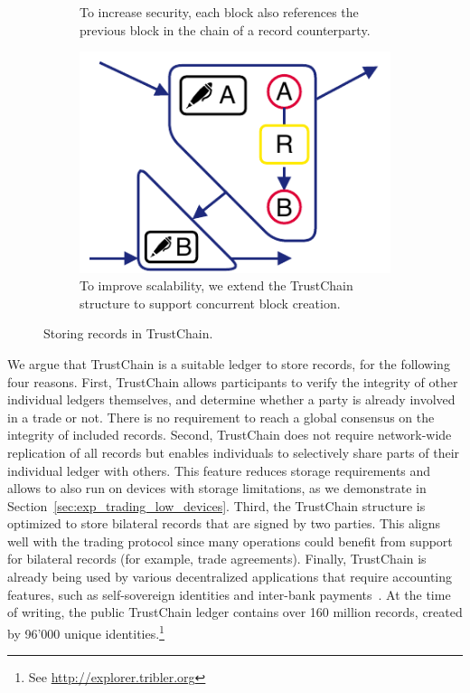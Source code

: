\begin{figure}[t]
\begin{subfigure}[t]{.45\textwidth}
		\caption{To increase security, each block also references the previous block in the chain of a record counterparty.}
		\label{fig:xchange_trustchain_tutorial_3}
	\end{subfigure}
	\begin{subfigure}[t]{.45\textwidth}
		\centering
		\captionsetup{width=.9\linewidth}
		\includegraphics[width=.71\linewidth]{xchange/assets/trustchain_tutorial_4}
		\caption{To improve scalability, we extend the TrustChain structure to support concurrent block creation.}
		\label{fig:xchange_trustchain_tutorial_4}
	\end{subfigure}\hspace{0.05\textwidth}%
	\caption{Storing records in TrustChain.}
	\label{fig:xchange_trustchain_tutorial}
\end{figure}

We argue that TrustChain is a suitable ledger to store \ModelName{} records, for the following four reasons.
First, TrustChain allows participants to verify the integrity of other individual ledgers themselves, and determine whether a party is already involved in a trade or not.
There is no requirement to reach a global consensus on the integrity of included records.
Second, TrustChain does not require network-wide replication of all records but enables individuals to selectively share parts of their individual ledger with others.
This feature reduces storage requirements and allows \ModelName{} to also run on devices with storage limitations, as we demonstrate in Section~\ref{sec:exp_trading_low_devices}.
Third, the TrustChain structure is optimized to store bilateral records that are signed by two parties.
This aligns well with the \ModelName{} trading protocol since many operations could benefit from support for bilateral records (for example, trade agreements).
Finally, TrustChain is already being used by various decentralized applications that require accounting features, such as self-sovereign identities and inter-bank payments~\cite{stokkink2018deployment,de2018real}.
At the time of writing, the public TrustChain ledger contains over 160 million records, created by 96'000 unique identities.\footnote{See \url{http://explorer.tribler.org}}

